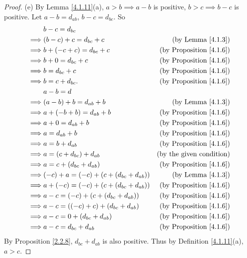 \begin{proof}{(e)}
By Lemma \ref{4.1.11}(a), \(a > b \implies a - b\) is positive, \(b > c \implies b - c\) is positive.
Let \(a - b = d_{ab}\), \(b - c = d_{bc}\).
So
\begin{align*}
& b - c = d_{bc} \\
\implies & (b - c) + c = d_{bc} + c & \text{(by Lemma \ref{4.1.3})} \\
\implies & b + (-c + c) = d_{bc} + c & \text{(by Proposition \ref{4.1.6})} \\
\implies & b + 0 = d_{bc} + c & \text{(by Proposition \ref{4.1.6})} \\
\implies & b = d_{bc} + c & \text{(by Proposition \ref{4.1.6})} \\
\implies & b = c + d_{bc}. & \text{(by Proposition \ref{4.1.6})} \\
& a - b = d \\
\implies & (a - b) + b = d_{ab} + b & \text{(by Lemma \ref{4.1.3})} \\
\implies & a + (-b + b) = d_{ab} + b & \text{(by Proposition \ref{4.1.6})} \\
\implies & a + 0 = d_{ab} + b & \text{(by Proposition \ref{4.1.6})} \\
\implies & a = d_{ab} + b & \text{(by Proposition \ref{4.1.6})} \\
\implies & a = b + d_{ab} & \text{(by Proposition \ref{4.1.6})} \\
\implies & a = (c + d_{bc}) + d_{ab} & \text{(by the given condition)} \\
\implies & a = c + (d_{bc} + d_{ab}) & \text{(by Proposition \ref{4.1.6})} \\
\implies & (-c) + a = (-c) + (c + (d_{bc} + d_{ab})) & \text{(by Lemma \ref{4.1.3})} \\
\implies & a + (-c) = (-c) + (c + (d_{bc} + d_{ab})) & \text{(by Proposition \ref{4.1.6})} \\
\implies & a - c = (-c) + (c + (d_{bc} + d_{ab})) & \text{(by Proposition \ref{4.1.6})} \\
\implies & a - c = ((-c) + c) + (d_{bc} + d_{ab}) & \text{(by Proposition \ref{4.1.6})} \\
\implies & a - c = 0 + (d_{bc} + d_{ab}) & \text{(by Proposition \ref{4.1.6})} \\
\implies & a - c = d_{bc} + d_{ab} & \text{(by Proposition \ref{4.1.6})} \\
\end{align*}
By Proposition \ref{2.2.8}, \(d_{bc} + d_{ab}\) is also positive.
Thus by Definition \ref{4.1.11}(a), \(a > c\).
\end{proof}


